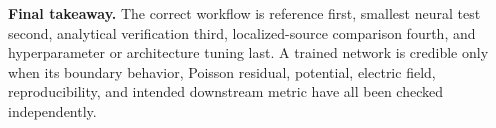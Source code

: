 \documentclass[11pt]{article}
\begin{document}
\begin{physicsbox}
\textbf{Final takeaway.} The correct workflow is reference first, smallest neural test second, analytical verification third, localized-source comparison fourth, and hyperparameter or architecture tuning last. A trained network is credible only when its boundary behavior, Poisson residual, potential, electric field, reproducibility, and intended downstream metric have all been checked independently.
\end{physicsbox}
\end{document}
